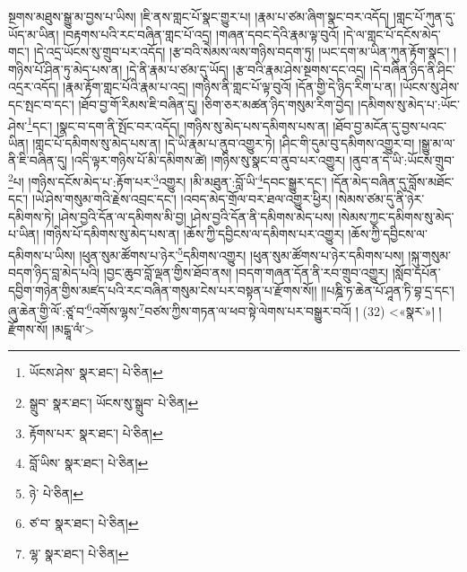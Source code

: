 སྔགས་མཐུས་སྒྱུ་མ་བྱས་པ་ཡིས། །ཇི་ནས་གླང་པོ་སྣང་གྱུར་པ། །རྣམ་པ་ཙམ་ཞིག་སྣང་བར་འདོད། །གླང་པོ་ཀུན་དུ་ཡོད་མ་ཡིན། །བརྟགས་པའི་རང་བཞིན་གླང་པོ་འདྲ། །གཞན་དབང་དེའི་རྣམ་ལྟ་བུའོ། །དེ་ལ་གླང་པོ་དངོས་མེད་གང་། །དེ་འདྲ་ཡོངས་སུ་གྲུབ་པར་འདོད། །རྩ་བའི་སེམས་ལས་གཉིས་བདག་ཏུ། །ཡང་དག་མ་ཡིན་ཀུན་རྟོག་སྣང་། །གཉིས་པོ་ཤིན་ཏུ་མེད་པས་ན། །དེ་ནི་རྣམ་པ་ཙམ་དུ་ཡོད། །རྩ་བའི་རྣམ་ཤེས་སྔགས་དང་འདྲ། །དེ་བཞིན་ཉིད་ནི་ཤིང་འདྲར་འདོད། །རྣམ་རྟོག་གླང་པོའི་རྣམ་པ་འདྲ། །གཉིས་ནི་གླང་པོ་ལྟ་བུའོ། །དོན་གྱི་དེ་ཉིད་རིག་པ་ན། །ཡོངས་སུ་ཤེས་དང་སྤང་བ་དང་། །ཐོབ་བྱ་གོ་རིམས་ཇི་བཞིན་དུ། །ཅིག་ཅར་མཚན་ཉིད་གསུམ་རིག་བྱེད། །དམིགས་སུ་མེད་པ་:ཡོང་ཤེས་\footnote{ཡོངས་ཤེས་  སྣར་ཐང་།  པེ་ཅིན། }དང་། །སྣང་བ་དག་ནི་སྤོང་བར་འདོད། །གཉིས་སུ་མེད་པས་དམིགས་པས་ན། །ཐོབ་བྱ་མངོན་དུ་བྱས་པའང་ཡིན། །གླང་པོ་དམིགས་སུ་མེད་པས་ན། །དེ་ཡི་རྣམ་པ་ནུབ་འགྱུར་ཏེ། །ཤིང་གི་དུམ་བུ་དམིགས་འགྱུར་བ། །སྒྱུ་མ་ལ་ནི་ཇི་བཞིན་དུ། །འདི་ལྟར་གཉིས་པོ་མི་དམིགས་ཚེ། །གཉིས་སུ་སྣང་བ་ནུབ་པར་འགྱུར། །ནུབ་ན་དེ་ཡི་:ཡོངས་གྲུབ་\footnote{སྒྲུབ་  སྣར་ཐང་། ཡོངས་སུ་སྒྲུབ་  པེ་ཅིན། }པ། །གཉིས་དངོས་མེད་པ་:རྟོག་པར་\footnote{རྟོགས་པར་  སྣར་ཐང་།  པེ་ཅིན། }འགྱུར། །མི་མཐུན་:བློ་ཡི་\footnote{བློ་ཡིས་  སྣར་ཐང་།  པེ་ཅིན། }དབང་སྒྱུར་དང་། །དོན་མེད་བཞིན་དུ་བློས་མཐོང་དང་། །ཡེ་ཤེས་གསུམ་གའི་རྗེས་འབྲང་དང་། །འབད་མེད་གྲོལ་བར་ཐལ་འགྱུར་ཕྱིར། །སེམས་ཙམ་དུ་ནི་ཉེར་དམིགས་ཏེ། །ཤེས་བྱའི་དོན་ལ་དམིགས་མི་བྱ། །ཤེས་བྱའི་དོན་ནི་དམིགས་མེད་པས། །སེམས་ཀྱང་དམིགས་སུ་མེད་པ་ཡིན། །གཉིས་པོ་དམིགས་སུ་མེད་པས་ན། །ཆོས་ཀྱི་དབྱིངས་ལ་དམིགས་པར་འགྱུར། །ཆོས་ཀྱི་དབྱིངས་ལ་དམིགས་པ་ཡིས། །ཕུན་སུམ་ཚོགས་པ་ཉེར་\footnote{ཉེ་  པེ་ཅིན། }དམིགས་འགྱུར། །ཕུན་སུམ་ཚོགས་པ་ཉེར་དམིགས་པས། །སྐུ་གསུམ་བདག་ཉིད་བླ་མེད་པའི། །བྱང་ཆུབ་བློ་ལྡན་གྱིས་ཐོབ་ནས། །བདག་གཞན་དོན་ནི་རབ་གྲུབ་འགྱུར། །སློབ་དཔོན་དབྱིག་གཉེན་གྱིས་མཛད་པའི་རང་བཞིན་གསུམ་ངེས་པར་བསྟན་པ་རྫོགས་སོ།། །།པཎྜི་ཏ་ཆེན་པོ་ཤཱན་ཏི་བྷ་དྲ་དང་། ཞུ་ཆེན་གྱི་ལོ་:ཙཱ་བ་\footnote{ཙ་བ་  སྣར་ཐང་།  པེ་ཅིན། }འགོས་ལྷས་\footnote{ལྷ་  སྣར་ཐང་།  པེ་ཅིན། }བཙས་ཀྱིས་གཏན་ལ་ཕབ་སྟེ་ལེགས་པར་བསྒྱུར་བའོ། ། (32) <«སྣར་»། །
 རྫོགས་སོ། །མངྒཱ་ལཾ་>